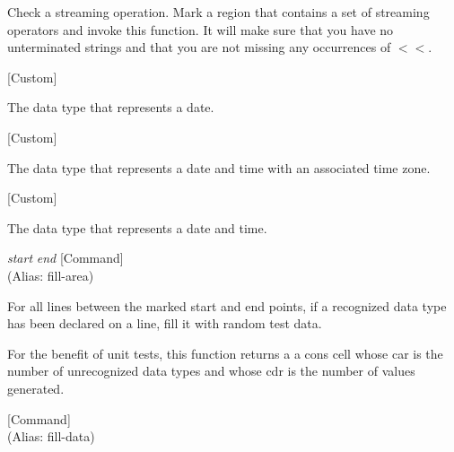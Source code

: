 \begin{doc-string}
Check a streaming operation.   Mark a region that contains a set of streaming
operators and invoke this function.  It will make sure that you have no unterminated
strings and that you are not missing any occurrences of $<$$<$.
\end{doc-string}

\vspace{1em}
\noindent
{}
\usebox{\funcname}
 \hfill [Custom]

\begin{doc-string}
The data type that represents a date.
\end{doc-string}

\vspace{1em}
\noindent
{}
\usebox{\funcname}
 \hfill [Custom]

\begin{doc-string}
The data type that represents a date and time with an associated time zone.
\end{doc-string}

\vspace{1em}
\noindent
{}
\usebox{\funcname}
 \hfill [Custom]

\begin{doc-string}
The data type that represents a date and time.
\end{doc-string}

\vspace{1em}
\noindent
{}
\usebox{\funcname}\emph{start} \emph{end}
 \hfill [Command]\\%
 (Alias: fill-area)

\begin{doc-string}
For all lines between the marked start and end points, if a recognized data
type has been declared on a line, fill it with random test data.

For the benefit of unit tests, this function returns a a cons cell whose car is
the number of unrecognized data types and whose cdr is the number of values
generated.
\end{doc-string}

\vspace{1em}
\noindent
{}
\usebox{\funcname}
 \hfill [Command]\\%
 (Alias: fill-data)


